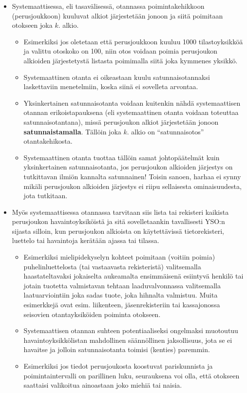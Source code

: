 \documentclass[
]{book}
\providecommand{\tightlist}{%
  \setlength{\itemsep}{0pt}\setlength{\parskip}{0pt}}
\begin{document}
\begin{itemize}
\tightlist
\item
  Systemaattisessa, eli tasavälisessä, otannassa poimintakehikkoon (perusjoukkoon) kuuluvat alkiot järjestetään jonoon ja siitä poimitaan otokseen joka \(k\). alkio.

  \begin{itemize}
  \tightlist
  \item
    Esimerkiksi jos oletetaan että perusjoukkoon kuuluu 1000 tilastoyksikköä ja valittu otoskoko on 100, niin otos voidaan poimia perusjoukon alkioiden järjestetystä listasta poimimalla siitä joka kymmenes yksikkö.
  \item
    Systemaattinen otanta ei oikeastaan kuulu satunnaisotannaksi laskettaviin menetelmiin, koska siinä ei sovelleta arvontaa.
  \item
    Yksinkertainen satunnaisotanta voidaan kuitenkin nähdä systemaattisen otannan erikoistapauksena (eli systemaattinen otanta voidaan toteuttaa satunnaisotantana), missä perusjoukon alkiot järjestetään jonoon \textbf{satunnaistamalla}. Tällöin joka \(k\). alkio on ``satunnaisotos'' otantakehikosta.
  \item
    Systemaattinen otanta tuottaa tällöin samat johtopäätelmät kuin yksinkertainen satunnaisotanta, jos perusjoukon alkioiden järjestys on tutkittavan ilmiön kannalta satunnainen! Toisin sanoen, harhaa ei synny mikäli perusjoukon alkioiden järjestys ei riipu sellaisesta ominaisuudesta, jota tutkitaan.
  \end{itemize}
\item
  Myös systemaattisessa otannassa tarvitaan siis lista tai rekisteri kaikista perusjoukon havaintoyksiköistä ja sitä sovelletaankin tavallisesti YSO:n sijasta silloin, kun perusjoukon alkioista on käytettävissä tietorekisteri, luettelo tai havaintoja kerätään ajassa tai tilassa.

  \begin{itemize}
  \tightlist
  \item
    Esimerkiksi mielipidekyselyn kohteet poimitaan (voitiin poimia) puhelinluettelosta (tai vastaavasta rekisteristä) valitsemalla haastateltavaksi jokaiselta aukeamalta ensimmäisenä esiintyvä henkilö tai jotain tuotetta valmistavan tehtaan laaduvalvonnassa valitsemalla laatuarviointiin joka sadas tuote, joka hihnalta valmistuu. Muita esimerkkejä ovat esim. liikenteen, jäsenrekisteriin tai kassajonossa seisovien otantayksiköiden poiminta otokseen.
  \item
    Systemaattisen otannan suhteen potentiaaliseksi ongelmaksi muotoutuu havaintoyksikkölistan mahdollinen säännöllinen jaksollisuus, jota se ei havaitse ja jolloin satunnaisotanta toimisi (kenties) paremmin.
  \item
    Esimerkiksi jos tiedot perusjoukosta koostuvat pariskunnista ja poimintaintervalli on parillinen luku, seurauksena voi olla, että otokseen saattaisi valikoitua ainoastaan joko miehiä tai naisia.
  \end{itemize}
\end{itemize}
\end{document}
